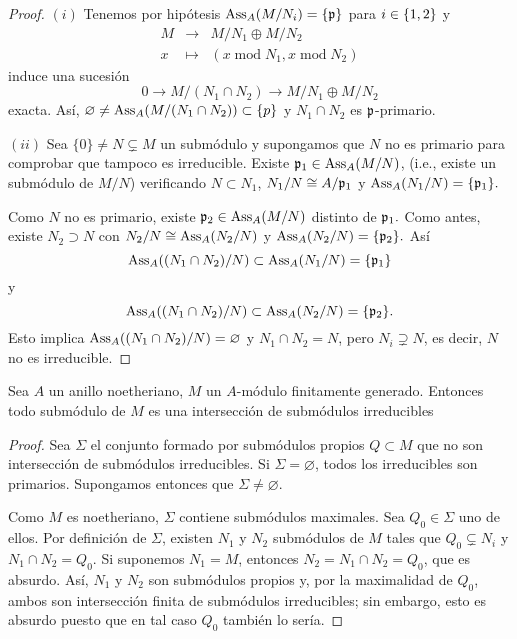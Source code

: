 \documentclass[../main.tex]{subfiles}
\begin{document}
\begin{proof}
$(i)$ Tenemos por hipótesis $\text{Ass}_A(M/N_i)=\{\mathfrak{p}\}$ para $i\in\{1,2\}$ y
$$\begin{array}{rcl}
    M&\longrightarrow& M/N_1\oplus M/N_2\\
    x&\longmapsto&(x\operatorname{mod}  N_1,x\operatorname{mod} N_2)
\end{array}$$
induce una sucesión
$$0\longrightarrow M/(N_1\cap N_2)\longrightarrow M/N_1\oplus M/N_2$$
exacta. Así, $\varnothing\neq \text{Ass}_A(M/(N_1\cap N_2))\subset \{p\}$ y $N_1\cap N_2$ es $\mathfrak{p}$-primario.

$(ii)$ Sea $\{0\}\neq N\subsetneq M$ un submódulo y supongamos que $N$ no es primario para comprobar que tampoco es irreducible. Existe $\mathfrak{p}_1\in\text{Ass}_A(M/N)$, (i.e., existe un submódulo de $M/N$) verificando $N\subset N_1$, $N_1/N\cong A/{\mathfrak{p}_1}$ y $\text{Ass}_A(N_1/N)=\{\mathfrak{p}_1\}.$

Como $N$ no es primario, existe $\mathfrak{p}_2\in\text{Ass}_A(M/N)$ distinto de $\mathfrak{p}_1.$ Como antes, existe $N_2\supset N$ con $N_2/N\cong\text{Ass}_A(N_2/N)$ y $\text{Ass}_A(N_2/N)=\{\mathfrak{p}_2\}.$ Así
$$\text{Ass}_A((N_1\cap N_2)/N)\subset\text{Ass}_A(N_1/N)=\{\mathfrak{p}_1\}$$
y
$$\text{Ass}_A((N_1\cap N_2)/N)\subset\text{Ass}_A(N_2/N)=\{\mathfrak{p}_2\}.$$
Esto implica $\text{Ass}_A((N_1\cap N_2)/N)=\varnothing$ y $N_1\cap N_2=N$, pero $N_i\supsetneq N$, es decir, $N$ no es irreducible.
\end{proof}

\begin{lemma}
Sea $A$ un anillo noetheriano, $M$ un $A$-módulo finitamente generado. Entonces todo submódulo de $M$ es una intersección de submódulos irreducibles
\end{lemma}
\begin{proof}
Sea $\Sigma$ el conjunto formado por submódulos propios $Q\subset M$ que no son intersección de submódulos irreducibles. Si $\Sigma=\varnothing$, todos los irreducibles son primarios. Supongamos entonces que $\Sigma\neq\varnothing.$

Como $M$ es noetheriano, $\Sigma$ contiene submódulos maximales. Sea $Q_0\in\Sigma$ uno de ellos. Por definición de $\Sigma$, existen $N_1$ y $N_2$ submódulos de $M$ tales que $Q_0\subsetneq N_i$ y $N_1\cap N_2=Q_0.$ Si suponemos $N_1=M$, entonces $N_2=N_1\cap N_2=Q_0$, que es absurdo. Así, $N_1$ y $N_2$ son submódulos propios y, por la maximalidad de $Q_0$, ambos son intersección finita de submódulos irreducibles; sin embargo, esto es absurdo puesto que en tal caso $Q_0$ también lo sería.
\end{proof}
\end{document}
